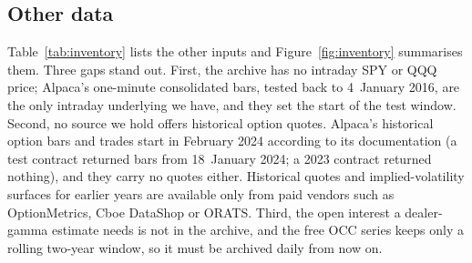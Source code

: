 \documentclass[10pt, a4paper, twocolumn]{article}
\begin{document}
\subsection{Other data}


Table~\ref{tab:inventory} lists the other inputs and Figure~\ref{fig:inventory} summarises them. Three gaps stand out. First, the archive has no intraday SPY or QQQ price; Alpaca's one-minute consolidated bars, tested back to 4~January 2016, are the only intraday underlying we have, and they set the start of the test window. Second, no source we hold offers historical option quotes. Alpaca's historical option bars and trades start in February 2024 according to its documentation (a test contract returned bars from 18~January 2024; a 2023 contract returned nothing), and they carry no quotes either. Historical quotes and implied-volatility surfaces for earlier years are available only from paid vendors such as OptionMetrics, Cboe DataShop or ORATS. Third, the open interest a dealer-gamma estimate needs is not in the archive, and the free OCC series keeps only a rolling two-year window, so it must be archived daily from now on.
\end{document}
